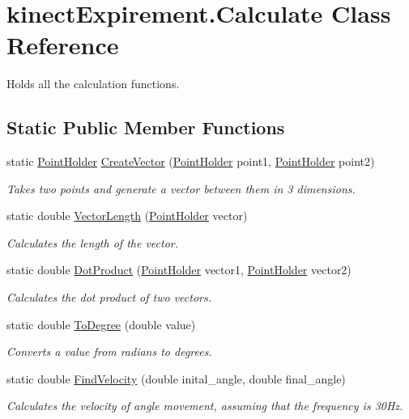 \hypertarget{classkinect_expirement_1_1_calculate}{}\section{kinect\+Expirement.\+Calculate Class Reference}
\label{classkinect_expirement_1_1_calculate}


Holds all the calculation functions. 


\subsection*{Static Public Member Functions}
\begin{DoxyCompactItemize}
\item 
static \hyperlink{classkinect_expirement_1_1_point_holder}{Point\+Holder} \hyperlink{classkinect_expirement_1_1_calculate_a8fdf801a3bdee7bd1a327cc42e86aed9}{Create\+Vector} (\hyperlink{classkinect_expirement_1_1_point_holder}{Point\+Holder} point1, \hyperlink{classkinect_expirement_1_1_point_holder}{Point\+Holder} point2)
\begin{DoxyCompactList}\small\item\em Takes two points and generate a vector between them in 3 dimensions. \end{DoxyCompactList}\item 
static double \hyperlink{classkinect_expirement_1_1_calculate_a9c9d55d2e89605013fd5280deb572468}{Vector\+Length} (\hyperlink{classkinect_expirement_1_1_point_holder}{Point\+Holder} vector)
\begin{DoxyCompactList}\small\item\em Calculates the length of the vector. \end{DoxyCompactList}\item 
static double \hyperlink{classkinect_expirement_1_1_calculate_a5e407f5e00cb311cea31f7172fa4a5d0}{Dot\+Product} (\hyperlink{classkinect_expirement_1_1_point_holder}{Point\+Holder} vector1, \hyperlink{classkinect_expirement_1_1_point_holder}{Point\+Holder} vector2)
\begin{DoxyCompactList}\small\item\em Calculates the dot product of two vectors. \end{DoxyCompactList}\item 
static double \hyperlink{classkinect_expirement_1_1_calculate_a02fbfb617abfb0e06c8e92cb25f9f9e8}{To\+Degree} (double value)
\begin{DoxyCompactList}\small\item\em Converts a value from radians to degrees. \end{DoxyCompactList}\item 
static double \hyperlink{classkinect_expirement_1_1_calculate_a91876175c733dc14e51ac1eb5c255142}{Find\+Velocity} (double inital\+\_\+angle, double final\+\_\+angle)
\begin{DoxyCompactList}\small\item\em Calculates the velocity of angle movement, assuming that the frequency is 30\+Hz. \end{DoxyCompactList}\end{DoxyCompactItemize}


